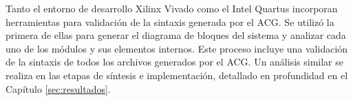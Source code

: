	Tanto el entorno de desarrollo Xilinx Vivado como el Intel Quartus incorporan herramientas para validación de la sintaxis generada por el ACG. Se utilizó la primera de ellas para generar el diagrama de bloques del sistema y analizar cada uno de los módulos y sus elementos internos. Este proceso incluye una validación de la sintaxis de todos los archivos generados por el ACG. Un análisis similar se realiza en las etapas de síntesis e implementación, detallado en profundidad en el Capítulo \ref{sec:resultados}.
	
